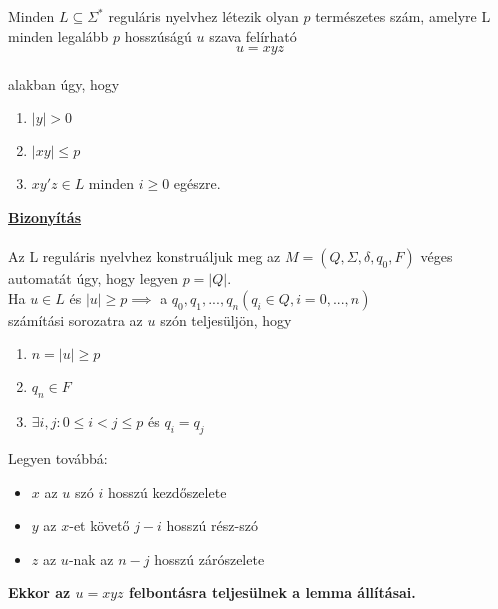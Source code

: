 \begin{frame}
\begin{tcolorbox}[title={Tétel: Pumpáló lemma reguláris nyelvre}]
Minden $L \subseteq {\Sigma}^*$ reguláris nyelvhez létezik olyan $p$ természetes szám, amelyre L minden legalább $p$ hosszúságú $u$ szava felírható $$u = xyz$$\\
alakban úgy, hogy\\
\begin{enumerate}
\item $|y| > 0$
\item $|xy| \leq p$
\item $xy'z \in L$ minden $i \geq 0$ egészre.
\end{enumerate}
\tcblower
\msmallskip
\underline{\textbf{Bizonyítás}}\\
\mmedskip
\\
Az L reguláris nyelvhez konstruáljuk meg az $M = (Q, {\Sigma}, {\delta}, q_0, F)$ véges automatát úgy, hogy legyen $p = |Q|$.\\
Ha $u \in L$ és $|u| \geq p \implies$ a $q_0, q_1, ...,q_n (q_i \in Q, i = 0, ..., n)$\\
számítási sorozatra az $u$ szón teljesüljön, hogy\\
\begin{enumerate}
\item $n = |u| \geq p$
\item $q_n \in F$
\item ${\exists}i, j : 0 \leq i < j \leq p$ és $q_i = q_j$
\end{enumerate}
\mbigskip
Legyen továbbá:
\begin{itemize}
\item $x$ az $u$ szó $i$ hosszú kezdőszelete
\item $y$ az $x$-et követő $j - i$ hosszú rész-szó
\item $z$ az $u$-nak az $n - j$ hosszú zárószelete 
\end{itemize}
\mbigskip
\textbf{Ekkor az $u = xyz$ felbontásra teljesülnek a lemma állításai.}
\end{tcolorbox}

\end{frame}

